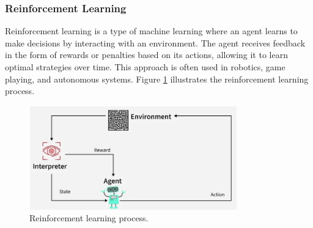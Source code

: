 \subsubsection{Reinforcement Learning}
Reinforcement learning is a type of machine learning where an agent learns to make decisions by interacting with an environment. The agent receives feedback in the form of rewards or penalties based on its actions, allowing it to learn optimal strategies over time. This approach is often used in robotics, game playing, and autonomous systems. Figure \ref{fig:reinforcement} illustrates the reinforcement learning process.
\begin{figure}[H]
  \centering
  \includegraphics[width=0.8\textwidth]{Images/Chapter1/reinforcement.png}
  \caption{Reinforcement learning process.}
  \label{fig:reinforcement}
\end{figure}

